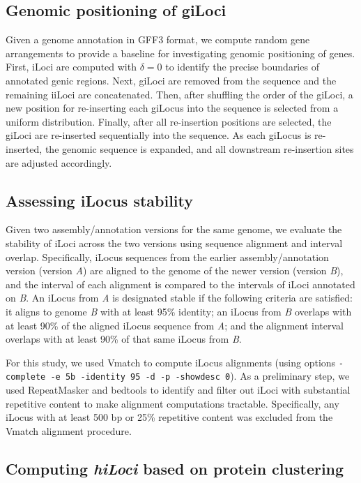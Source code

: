 \subsection*{Genomic positioning of giLoci}

Given a genome annotation in GFF3 format, we compute random gene arrangements to provide a baseline for investigating genomic positioning of genes.
First, iLoci are computed with $\delta=0$ to identify the precise boundaries of annotated genic regions.
Next, giLoci are removed from the sequence and the remaining iiLoci are concatenated.
Then, after shuffling the order of the giLoci, a new position for re-inserting each giLocus into the sequence is selected from a uniform distribution.
Finally, after all re-insertion positions are selected, the giLoci are re-inserted sequentially into the sequence.
As each giLocus is re-inserted, the genomic sequence is expanded, and all downstream re-insertion sites are adjusted accordingly.

\subsection*{Assessing iLocus stability}

Given two assembly/annotation versions for the same genome, we evaluate the stability of iLoci across the two versions using sequence alignment and interval overlap.
Specifically, iLocus sequences from the earlier assembly/annotation version (version \textit{A}) are aligned to the genome of the newer version (version \textit{B}), and the interval of each alignment is compared to the intervals of iLoci annotated on \textit{B}.
An iLocus from \textit{A} is designated stable if the following criteria are satisfied: it aligns to genome \textit{B} with at least 95\% identity; an iLocus from \textit{B} overlaps with at least 90\% of the aligned iLocus sequence from \textit{A}; and the alignment interval overlaps with at least 90\% of that same iLocus from \textit{B}.

For this study, we used Vmatch \cite{Vmatch} to compute iLocus alignments (using options \texttt{-complete -e 5b -identity 95 -d -p -showdesc 0}).
As a preliminary step, we used RepeatMasker \cite{RepeatMasker,RepBase} and bedtools \cite{bedtools} to identify and filter out iLoci with substantial repetitive content to make alignment computations tractable.
Specifically, any iLocus with at least 500 bp or 25\% repetitive content was excluded from the Vmatch alignment procedure.

\subsection*{Computing \textit{hiLoci} based on protein clustering}

